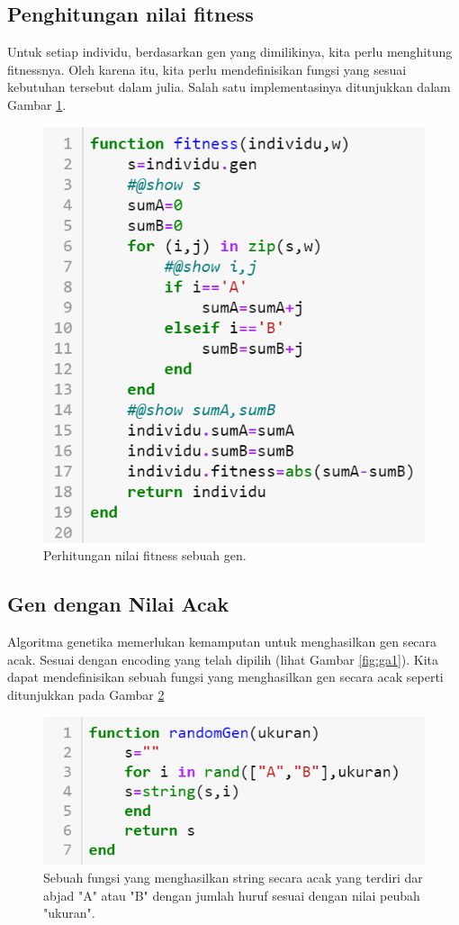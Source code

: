 \documentclass[12pt,a4paper]{memoir}
\begin{document}
\subsection{Penghitungan nilai fitness}
Untuk setiap individu, berdasarkan gen yang dimilikinya, kita perlu menghitung fitnessnya. Oleh karena itu, kita perlu mendefinisikan fungsi yang sesuai kebutuhan tersebut dalam julia. Salah satu implementasinya ditunjukkan dalam Gambar \ref{fig:ga2}.
\begin{figure}[h]
	\centering
	\includegraphics[width=0.7\linewidth]{images/ga2}
	\caption{Perhitungan nilai fitness sebuah gen.}
	\label{fig:ga2}
\end{figure}

\subsection{Gen dengan Nilai Acak}
Algoritma genetika memerlukan kemamputan untuk menghasilkan gen secara acak. Sesuai dengan encoding yang telah dipilih (lihat Gambar \ref{fig:ga1}). Kita dapat mendefinisikan sebuah fungsi yang menghasilkan gen secara acak seperti ditunjukkan pada Gambar \ref{fig:ga3}
\begin{figure}[h]
	\centering
	\includegraphics[width=0.7\linewidth]{images/ga3}
	\caption{Sebuah fungsi yang menghasilkan string secara acak yang terdiri dar abjad "A" atau "B" dengan jumlah huruf sesuai dengan nilai peubah "ukuran".}
	\label{fig:ga3}
\end{figure}
\end{document}
